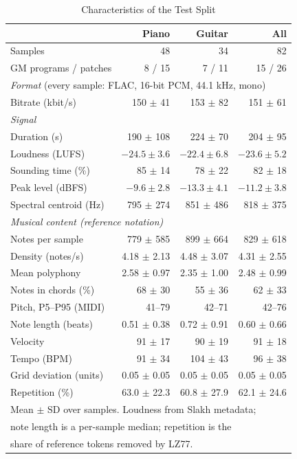 \documentclass[conference]{IEEEtran}
\begin{document}
\begin{table}[htbp]
\caption{Characteristics of the Test Split}
\label{tab:dataset}
\centering
\footnotesize
\setlength{\tabcolsep}{3pt}
\begin{tabular}{lrrr}
\hline
 & \textbf{Piano} & \textbf{Guitar} & \textbf{All} \\
\hline
Samples & 48 & 34 & 82 \\
GM programs / patches & 8 / 15 & 7 / 11 & 15 / 26 \\
\multicolumn{4}{l}{\textit{Format} (every sample: FLAC, 16-bit PCM, 44.1 kHz, mono)} \\
Bitrate (kbit/s) & 150 $\pm$ 41 & 153 $\pm$ 82 & 151 $\pm$ 61 \\
\multicolumn{4}{l}{\textit{Signal}} \\
Duration (s) & 190 $\pm$ 108 & 224 $\pm$ 70 & 204 $\pm$ 95 \\
Loudness (LUFS) & $-24.5 \pm 3.6$ & $-22.4 \pm 6.8$ & $-23.6 \pm 5.2$ \\
Sounding time (\%) & 85 $\pm$ 14 & 78 $\pm$ 22 & 82 $\pm$ 18 \\
Peak level (dBFS) & $-9.6 \pm 2.8$ & $-13.3 \pm 4.1$ & $-11.2 \pm 3.8$ \\
Spectral centroid (Hz) & 795 $\pm$ 274 & 851 $\pm$ 486 & 818 $\pm$ 375 \\
\multicolumn{4}{l}{\textit{Musical content (reference notation)}} \\
Notes per sample & 779 $\pm$ 585 & 899 $\pm$ 664 & 829 $\pm$ 618 \\
Density (notes/s) & 4.18 $\pm$ 2.13 & 4.48 $\pm$ 3.07 & 4.31 $\pm$ 2.55 \\
Mean polyphony & 2.58 $\pm$ 0.97 & 2.35 $\pm$ 1.00 & 2.48 $\pm$ 0.99 \\
Notes in chords (\%) & 68 $\pm$ 30 & 55 $\pm$ 36 & 62 $\pm$ 33 \\
Pitch, P5--P95 (MIDI) & 41--79 & 42--71 & 42--76 \\
Note length (beats) & 0.51 $\pm$ 0.38 & 0.72 $\pm$ 0.91 & 0.60 $\pm$ 0.66 \\
Velocity & 91 $\pm$ 17 & 90 $\pm$ 19 & 91 $\pm$ 18 \\
Tempo (BPM) & 91 $\pm$ 34 & 104 $\pm$ 43 & 96 $\pm$ 38 \\
Grid deviation (units) & 0.05 $\pm$ 0.05 & 0.05 $\pm$ 0.05 & 0.05 $\pm$ 0.05 \\
Repetition (\%) & 63.0 $\pm$ 22.3 & 60.8 $\pm$ 27.9 & 62.1 $\pm$ 24.6 \\
\hline
\multicolumn{4}{l}{Mean $\pm$ SD over samples. Loudness from Slakh metadata;} \\
\multicolumn{4}{l}{note length is a per-sample median; repetition is the} \\
\multicolumn{4}{l}{share of reference tokens removed by LZ77.} \\
\end{tabular}
\end{table}
\end{document}
